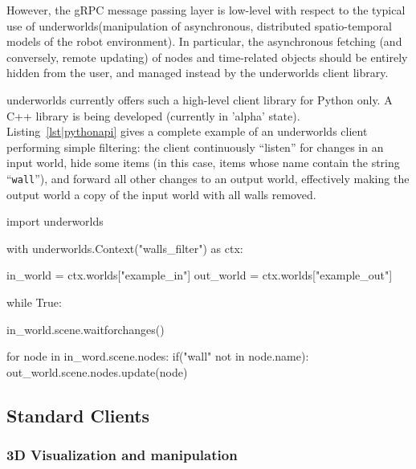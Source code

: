 \documentclass[letterpaper, 10 pt, conference]{ieeeconf}  %
\newcommand{\uwds}{{\sc underworlds}\xspace}
\begin{document}
However, the gRPC message passing layer is low-level with respect to the typical
use of \uwds (manipulation of asynchronous, distributed spatio-temporal models
of the robot environment). In particular, the asynchronous fetching (and
conversely, remote updating) of nodes and time-related objects should be
entirely hidden from the user, and managed instead by the \uwds client library.

\uwds currently offers such a high-level client library for Python only. A C++
library is being developed (currently in 'alpha' state).
Listing~\ref{lst|pythonapi} gives a complete example of an \uwds client
performing simple filtering: the client continuously ``listen'' for changes in
an input world, hide some items (in this case, items whose name contain the
string ``{\tt wall}''), and forward all other changes to an output world,
effectively making the output world a copy of the input world with all walls
removed.

\begin{listing}[h!]

\begin{pythoncode}
import underworlds

with underworlds.Context("walls_filter") as ctx:

    in_world = ctx.worlds["example_in"]
    out_world = ctx.worlds["example_out"]

    while True:

        in_world.scene.waitforchanges()

        for node in in_word.scene.nodes:
            if("wall" not in node.name):
                out_world.scene.nodes.update(node)


\end{pythoncode}
    \caption{Example of a simple yet complete \uwds filter, written in Python, and named {\tt
    walls\_filter}: the client connects to the \uwds network, walkthrough the
    scene graph of world {\tt example\_in}, filter out some objects, and publish
    the remaining objects in the world {\tt example\_out}.}
    
    \label{lst|pythonapi}
\end{listing}

\subsection{Standard Clients}
\label{std_clients}

\subsubsection{3D Visualization and manipulation}
\end{document}
